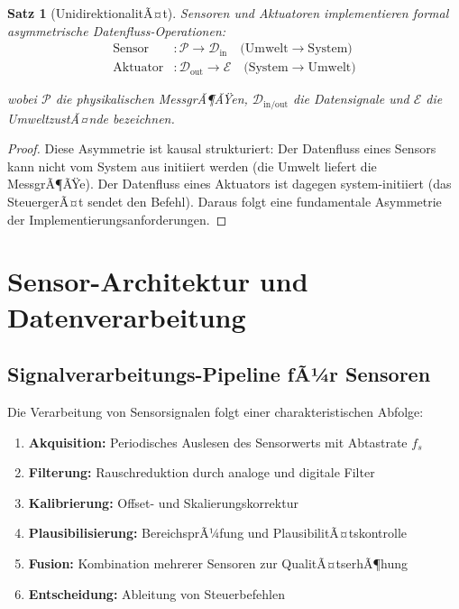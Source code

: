 ﻿\documentclass[a4paper,12pt]{article}
\newtheorem{satz}{Satz}
\begin{document}
\begin{satz}[UnidirektionalitÃ¤t]
Sensoren und Aktuatoren implementieren formal asymmetrische Datenfluss-Operationen:
\begin{align}
	\text{Sensor} &: \mathcal{P} \to \mathcal{D}_{\text{in}} 
	\quad \text{(Umwelt} \to \text{System)} \\
	\text{Aktuator} &: \mathcal{D}_{\text{out}} \to \mathcal{E} 
	\quad \text{(System} \to \text{Umwelt)}
\end{align}

wobei $\mathcal{P}$ die physikalischen MessgrÃ¶ÃŸen, $\mathcal{D}_{\text{in/out}}$ die 
Datensignale und $\mathcal{E}$ die UmweltzustÃ¤nde bezeichnen.
\end{satz}

\begin{proof}
Diese Asymmetrie ist kausal strukturiert: Der Datenfluss eines Sensors kann nicht 
vom System aus initiiert werden (die Umwelt liefert die MessgrÃ¶ÃŸe). Der Datenfluss 
eines Aktuators ist dagegen system-initiiert (das SteuergerÃ¤t sendet den Befehl). 
Daraus folgt eine fundamentale Asymmetrie der Implementierungsanforderungen. 
\end{proof}

\section{Sensor-Architektur und Datenverarbeitung}

\subsection{Signalverarbeitungs-Pipeline fÃ¼r Sensoren}

Die Verarbeitung von Sensorsignalen folgt einer charakteristischen Abfolge:

\begin{enumerate}
	\item \textbf{Akquisition:} Periodisches Auslesen des Sensorwerts mit Abtastrate $f_s$
	\item \textbf{Filterung:} Rauschreduktion durch analoge und digitale Filter
	\item \textbf{Kalibrierung:} Offset- und Skalierungskorrektur
	\item \textbf{Plausibilisierung:} BereichsprÃ¼fung und PlausibilitÃ¤tskontrolle
	\item \textbf{Fusion:} Kombination mehrerer Sensoren zur QualitÃ¤tserhÃ¶hung
	\item \textbf{Entscheidung:} Ableitung von Steuerbefehlen
\end{enumerate}
\end{document}

